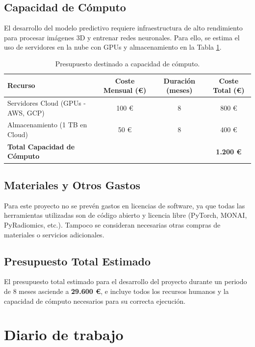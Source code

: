 \subsection{Capacidad de Cómputo}

El desarrollo del modelo predictivo requiere infraestructura de alto rendimiento para procesar imágenes 3D y entrenar redes neuronales. Para ello, se estima el uso de servidores en la nube con GPUs y almacenamiento en la Tabla \ref{tab:computo}.

\begin{table}[!htbp]
    \centering
    \begin{tabular}{|l|c|c|c|}
        \hline
        \textbf{Recurso} & \textbf{Coste Mensual (€)} & \textbf{Duración (meses)} & \textbf{Coste Total (€)} \\ \hline
        Servidores Cloud (GPUs - AWS, GCP) & 100 € & 8 & 800 € \\ 
        Almacenamiento (1 TB en Cloud) & 50 € & 8 & 400 € \\ \hline
        \textbf{Total Capacidad de Cómputo} & & & \textbf{1.200 €} \\ \hline
    \end{tabular}
    \caption{Presupuesto destinado a capacidad de cómputo.}
    \label{tab:computo}
\end{table}

\subsection{Materiales y Otros Gastos}

Para este proyecto no se prevén gastos en licencias de software, ya que todas las herramientas utilizadas son de código abierto y licencia libre (PyTorch, MONAI, PyRadiomics, etc.). Tampoco se consideran necesarias otras compras de materiales o servicios adicionales.

\subsection{Presupuesto Total Estimado}

El presupuesto total estimado para el desarrollo del proyecto durante un periodo de 8 meses asciende a \textbf{29.600 €}, e incluye todos los recursos humanos y la capacidad de cómputo necesarios para su correcta ejecución.


\section{Diario de trabajo}

